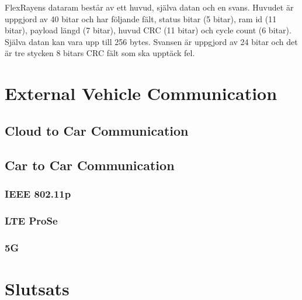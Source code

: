 \documentclass[a4paper]{IEEEtran}
\begin{document}
FlexRayens dataram består av ett huvud, själva datan och en svans. Huvudet är uppgjord av 40 bitar och har följande fält, status bitar (5 bitar), ram id (11 bitar), payload längd (7 bitar), huvud CRC (11 bitar) och cycle count (6 bitar). Själva datan kan vara upp till 256 bytes. Svansen är uppgjord av 24 bitar och det är tre stycken 8 bitars CRC fält som ska upptäck fel. \cite{FlexRayOverview}

\section{External Vehicle Communication}
\subsection{Cloud to Car Communication}


\subsection{Car to Car Communication}
\subsubsection{IEEE 802.11p}
\subsubsection{LTE ProSe}
\subsubsection{5G}


\section{Slutsats}
\end{document}

